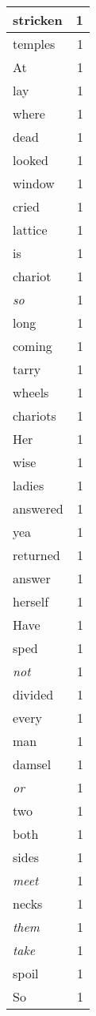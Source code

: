 \begin{center}
\begin{longtable}{l|r}
stricken & 1\\ \hline 
temples & 1\\ \hline 
At & 1\\ \hline 
lay & 1\\ \hline 
where & 1\\ \hline 
dead & 1\\ \hline 
looked & 1\\ \hline 
window & 1\\ \hline 
cried & 1\\ \hline 
lattice & 1\\ \hline 
is & 1\\ \hline 
chariot & 1\\ \hline 
\emph{so} & 1\\ \hline 
long & 1\\ \hline 
coming & 1\\ \hline 
tarry & 1\\ \hline 
wheels & 1\\ \hline 
chariots & 1\\ \hline 
Her & 1\\ \hline 
wise & 1\\ \hline 
ladies & 1\\ \hline 
answered & 1\\ \hline 
yea & 1\\ \hline 
returned & 1\\ \hline 
answer & 1\\ \hline 
herself & 1\\ \hline 
Have & 1\\ \hline 
sped & 1\\ \hline 
\emph{not} & 1\\ \hline 
divided & 1\\ \hline 
every & 1\\ \hline 
man & 1\\ \hline 
damsel & 1\\ \hline 
\emph{or} & 1\\ \hline 
two & 1\\ \hline 
both & 1\\ \hline 
sides & 1\\ \hline 
\emph{meet} & 1\\ \hline 
necks & 1\\ \hline 
\emph{them} & 1\\ \hline 
\emph{take} & 1\\ \hline 
spoil & 1\\ \hline 
So & 1\\ \hline 

\end{longtable}
\end{center}
